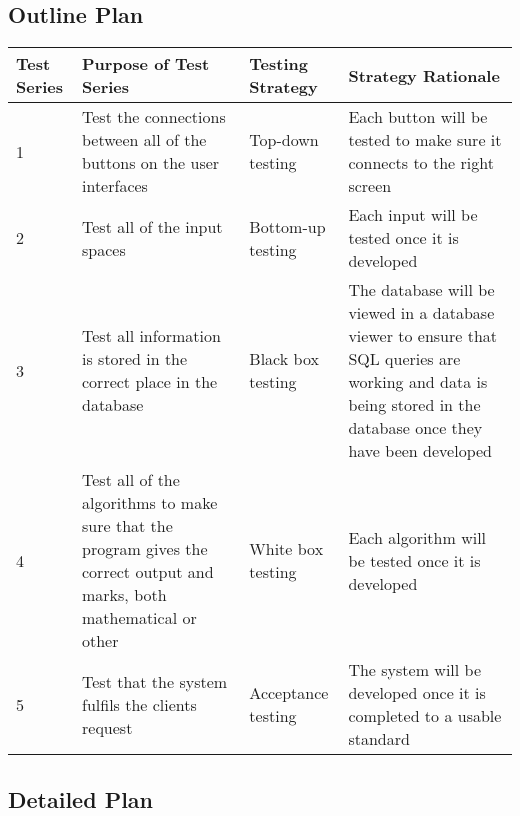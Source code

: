 \begin{landscape}
\subsection{Outline Plan}

\begin{center}
    \begin{tabular}{|p{2cm}|p{5cm}|p{5cm}|p{4cm}|}
        \hline
        \textbf{Test Series} & \textbf{Purpose of Test Series} & \textbf{Testing Strategy} & \textbf{Strategy Rationale}\\ \hline
        1 & Test the connections between all of the buttons on the user interfaces & Top-down testing & Each button will be tested to make sure it connects to the right screen \\ \hline
        2 & Test all of the input spaces & Bottom-up testing & Each input will be tested once it is developed \\ \hline
        3 & Test all information is stored in the correct place in the database & Black box testing & The database will be viewed in a database viewer to ensure that SQL queries are working and data is being stored in the database once they have been developed \\ \hline
	4 & Test all of the algorithms to make sure that the program gives the correct output and marks, both mathematical or other & White box testing & Each algorithm will be tested once it is developed \\ \hline
	5 & Test that the system fulfils the clients request & Acceptance testing & The system will be developed once it is completed to a usable standard \\ \hline
    \end{tabular}
\end{center}

\subsection{Detailed Plan}


\end{landscape}
